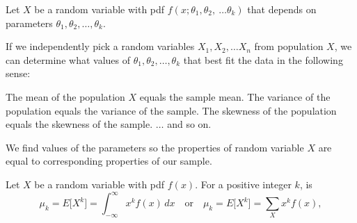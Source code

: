 \pagestyle{fancy}
\renewcommand{\theUnit}{6}
\ifthenelse{\isundefined{\UnitPageNumbers}}{}{\setcounter{page}{1}}
\rhead{Chapter \theUnit: Estimation}
\rfoot{\mypage}
\renewcommand{\footrulewidth}{.4pt}
\vspace*{-20pt} \thispagestyle{firstfooter}






\bi
\ii Let $X$ be a random variable with pdf $f(x; \theta_1, \theta_2, \ \ldots \theta_k)$ that depends on parameters $\theta_1, \theta_2, \ldots , \theta_k$. \medskip

\ii If we independently pick a random variables $X_1, X_2, \ldots X_n$ from population $X$, we can determine what values of $\theta_1, \theta_2, \ldots , \theta_k$  that best fit the data in the following sense:

\bb
\ii The mean of the population $X$ equals the sample mean.
\ii The variance of the population equals the variance of the sample.
\ii The skewness of the population equals the skewness of the sample.
\ii $\ldots$ and so on.
\ee

\ii We find values of the parameters so the properties of random variable $X$ are equal to corresponding properties of our sample.
  \ei


  \bbox
Let $X$ be a random variable with pdf $f(x)$. For a positive integer $k$,  is
\[ \mu_k = E \lbrack X^k \rbrack = \int_{-\infty}^{\infty} x^kf(x) \, dx \ \ \ \mbox{ or } \ \ \  \mu_k = E\lbrack X^k \rbrack = \sum_X x^kf(x),\]


